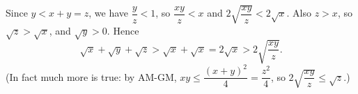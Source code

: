 Since $y<x+y=z$, we have $\dfrac {y}{z}<1$, so $\dfrac{xy}{z}<x$ and $2\sqrt{\dfrac{xy}{z}}<2\sqrt x$. Also $z>x$, so $\sqrt z>\sqrt x$, and $\sqrt y>0$. Hence
\[\sqrt x+\sqrt y+\sqrt z>\sqrt x+\sqrt x=2\sqrt x>2\sqrt{\dfrac{xy}{z}} .\]
(In fact much more is true: by AM-GM, $xy\le\dfrac{(x+y)^2}{4}=\dfrac{z^2}{4}$, so $2\sqrt{\dfrac{xy}{z}}\le\sqrt z$.)

